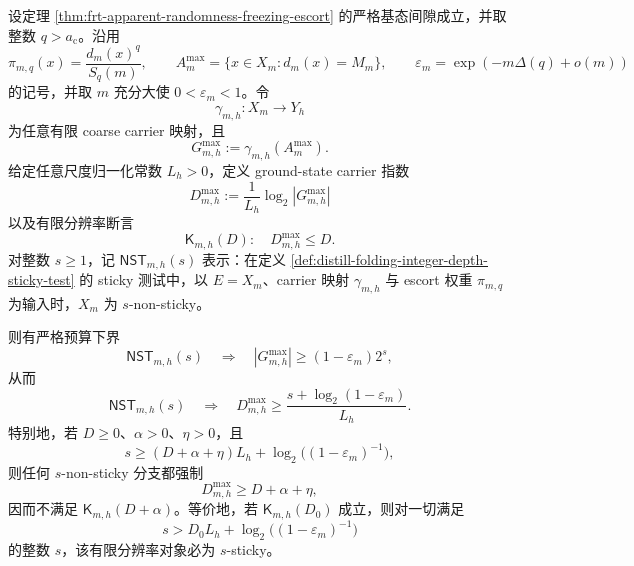 \begin{proposition}\label{distill:wang_zahl-worst_counterexample_exponent_bootstrapping-frt-nonsticky-carrier-exponent-budget}
设定理 \ref{thm:frt-apparent-randomness-freezing-escort} 的严格基态间隙成立，并取整数 \(q>a_{\mathrm c}\)。沿用
\[
\pi_{m,q}(x)=\frac{d_m(x)^q}{S_q(m)},
\qquad
A_m^{\max}=\{x\in X_m:d_m(x)=M_m\},
\qquad
\varepsilon_m=\exp(-m\Delta(q)+o(m))
\]
的记号，并取 \(m\) 充分大使 \(0<\varepsilon_m<1\)。令
\[
\gamma_{m,h}:X_m\to Y_h
\]
为任意有限 coarse carrier 映射，且
\[
G_{m,h}^{\max}:=\gamma_{m,h}(A_m^{\max}).
\]
给定任意尺度归一化常数 \(L_h>0\)，定义 ground-state carrier 指数
\[
D_{m,h}^{\max}:=\frac{1}{L_h}\log_2 |G_{m,h}^{\max}|
\]
以及有限分辨率断言
\[
\mathsf K_{m,h}(D):\quad D_{m,h}^{\max}\le D.
\]
对整数 \(s\ge1\)，记 \(\mathsf{NST}_{m,h}(s)\) 表示：在定义 \ref{def:distill-folding-integer-depth-sticky-test} 的 sticky 测试中，以 \(E=X_m\)、carrier 映射 \(\gamma_{m,h}\) 与 escort 权重 \(\pi_{m,q}\) 为输入时，\(X_m\) 为 \(s\)-non-sticky。

则有严格预算下界
\[
\mathsf{NST}_{m,h}(s)
\quad\Longrightarrow\quad
|G_{m,h}^{\max}|\ge (1-\varepsilon_m)2^s,
\]
从而
\[
\mathsf{NST}_{m,h}(s)
\quad\Longrightarrow\quad
D_{m,h}^{\max}\ge
\frac{s+\log_2(1-\varepsilon_m)}{L_h}.
\]
特别地，若 \(D\ge0\)、\(\alpha>0\)、\(\eta>0\)，且
\[
s\ge (D+\alpha+\eta)L_h+\log_2\!\bigl((1-\varepsilon_m)^{-1}\bigr),
\]
则任何 \(s\)-non-sticky 分支都强制
\[
D_{m,h}^{\max}\ge D+\alpha+\eta,
\]
因而不满足 \(\mathsf K_{m,h}(D+\alpha)\)。等价地，若 \(\mathsf K_{m,h}(D_0)\) 成立，则对一切满足
\[
s>D_0L_h+\log_2\!\bigl((1-\varepsilon_m)^{-1}\bigr)
\]
的整数 \(s\)，该有限分辨率对象必为 \(s\)-sticky。
\end{proposition}

